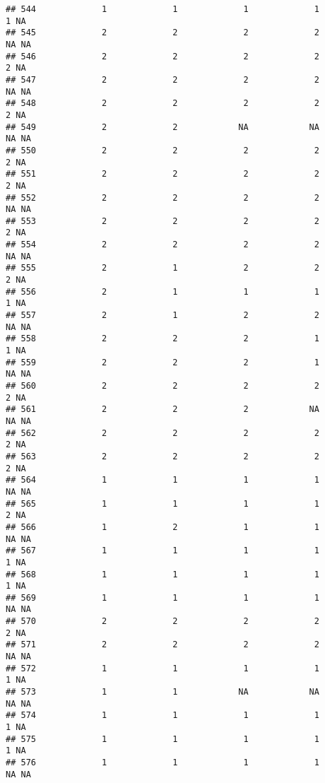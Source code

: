 \documentclass[
]{article}
\begin{document}
\begin{verbatim}
## 544             1             1             1             1             1 NA
## 545             2             2             2             2            NA NA
## 546             2             2             2             2             2 NA
## 547             2             2             2             2            NA NA
## 548             2             2             2             2             2 NA
## 549             2             2            NA            NA            NA NA
## 550             2             2             2             2             2 NA
## 551             2             2             2             2             2 NA
## 552             2             2             2             2            NA NA
## 553             2             2             2             2             2 NA
## 554             2             2             2             2            NA NA
## 555             2             1             2             2             2 NA
## 556             2             1             1             1             1 NA
## 557             2             1             2             2            NA NA
## 558             2             2             2             1             1 NA
## 559             2             2             2             1            NA NA
## 560             2             2             2             2             2 NA
## 561             2             2             2            NA            NA NA
## 562             2             2             2             2             2 NA
## 563             2             2             2             2             2 NA
## 564             1             1             1             1            NA NA
## 565             1             1             1             1             2 NA
## 566             1             2             1             1            NA NA
## 567             1             1             1             1             1 NA
## 568             1             1             1             1             1 NA
## 569             1             1             1             1            NA NA
## 570             2             2             2             2             2 NA
## 571             2             2             2             2            NA NA
## 572             1             1             1             1             1 NA
## 573             1             1            NA            NA            NA NA
## 574             1             1             1             1             1 NA
## 575             1             1             1             1             1 NA
## 576             1             1             1             1            NA NA

\end{verbatim}
\end{document}
